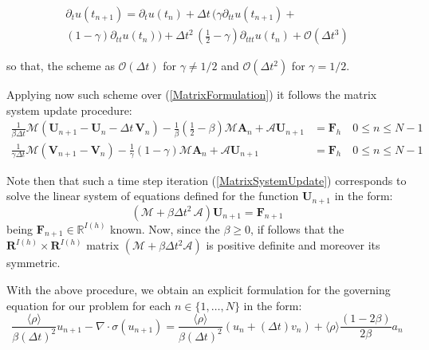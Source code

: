 \begin{multline}
    \partial_{t} u(t_{n+1}) = \partial_{t} u(t_n) + \Delta t\, \big( \gamma \partial_{tt} u(t_{n+1}) + \\
    (1-\gamma) \partial_{tt}u(t_n) \big) + \Delta t^2 \, (\frac{1}{2}-\gamma) \partial_{ttt} u(t_n) + \mathcal{O}(\Delta t^3)
\end{multline}

so that, the scheme as $\mathcal{O}(\Delta t)$ for $\gamma \neq 1/2$ and $\mathcal{O}(\Delta t^2)$ for $\gamma = 1/2$.

Applying now such scheme over (\ref{MatrixFormulation}) it follows the matrix system update procedure:
\begin{align}
    \label{MatrixSystemUpdate}
    \frac{1}{\beta \Delta t} \mathcal{M}(\mathbf{U}_{n+1} - \mathbf{U}_{n} - \Delta t\, \mathbf{V}_n) - \frac{1}{\beta}(\frac{1}{2}- \beta) \mathcal{M}\mathbf{A}_n + \mathcal{A}\mathbf{U}_{n+1} &= \mathbf{F}_h \quad 0 \leq n \leq N-1 \\
    \frac{1}{\gamma \Delta t} \mathcal{M}(\mathbf{V}_{n+1} - \mathbf{V}_{n}) - \frac{1}{\gamma}(1-\gamma) \mathcal{M}\mathbf{A}_n + \mathcal{A}\mathbf{U}_{n+1} & = \mathbf{F}_h \quad 0 \leq n \leq N-1
\end{align}

Note then that such a time step iteration (\ref{MatrixSystemUpdate}) corresponds to solve the linear system of equations defined for the function $\mathbf{U}_{n+1}$ in the form:
\begin{equation*}
    (\mathcal{M}+ \beta \Delta t^2 \, \mathcal{A}) \mathbf{U}_{n+1} = \mathbf{F}_{n+1}
\end{equation*}
being $\mathbf{F}_{n+1} \in \mathbb{R}^{I(h)}$ known.
Now, since the $\beta \geq 0$, if follows that the $\mathbf{R}^{I(h)} \times \mathbf{R}^{I(h)}$ matrix $(\mathcal{M}+ \beta \Delta t^2 \mathcal{A})$ is positive definite and moreover its symmetric.


With the above procedure, we obtain an explicit formulation for the governing equation for our problem for each $n \in \{1,\dots, N\}$ in the form:
\begin{equation*}
    \frac{\langle\rho\rangle}{\beta (\Delta t)^2} u_{n+1} - \nabla \cdot \sigma(u_{n+1}) = \frac{\langle\rho\rangle}{\beta (\Delta t)^2} ( u_{n} + (\Delta t) v_n ) + \langle\rho\rangle\frac{(1-2\beta)}{2\beta} a_n
\end{equation*}

